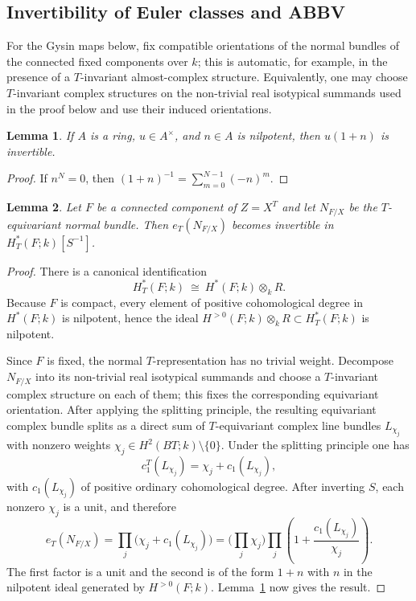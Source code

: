 \documentclass[10pt,a4paper,dvipsnames,x11names]{amsart}
\numberwithin{equation}{section}
\theoremstyle{plain}
\newtheorem{lemma}[lemma]{Lemma}
\theoremstyle{definition}
\theoremstyle{remark}
\begin{document}
\subsection{Invertibility of Euler classes and ABBV}

For the Gysin maps below, fix compatible orientations of the normal bundles of the connected fixed components over $k$; this is automatic, for example, in the presence of a $T$-invariant almost-complex structure.  Equivalently, one may choose $T$-invariant complex structures on the non-trivial real isotypical summands used in the proof below and use their induced orientations.

\begin{lemma}\label{lem:unit-nilp}
If $A$ is a ring, $u\in A^\times$, and $n\in A$ is nilpotent, then $u(1+n)$ is invertible.
\end{lemma}

\begin{proof}
If $n^N=0$, then $(1+n)^{-1}=\sum_{m=0}^{N-1}(-n)^m$.
\end{proof}

\begin{lemma}\label{lem:euler-invert}
Let $F$ be a connected component of $Z=X^T$ and let $N_{F/X}$ be the $T$-equivariant normal bundle.
Then $e_T(N_{F/X})$ becomes invertible in $H_T^*(F;k)[S^{-1}]$.
\end{lemma}

\begin{proof}
There is a canonical identification
$$
H_T^*(F;k)\ \cong\ H^*(F;k)\otimes_k R.
$$
Because $F$ is compact, every element of positive cohomological degree in $H^*(F;k)$ is nilpotent, hence the ideal
$H^{>0}(F;k)\otimes_k R \subset H_T^*(F;k)$ is nilpotent.

Since $F$ is fixed, the normal $T$-representation has no trivial weight.  Decompose $N_{F/X}$ into its non-trivial real isotypical summands and choose a $T$-invariant complex structure on each of them; this fixes the corresponding equivariant orientation.  After applying the splitting principle, the resulting equivariant complex bundle splits as a direct sum of $T$-equivariant complex line bundles $L_{\chi_j}$ with nonzero weights $\chi_j\in H^2(BT;k)\setminus\{0\}$.
Under the splitting principle one has
$$
c_1^T(L_{\chi_j})=\chi_j+c_1(L_{\chi_j}),
$$
with $c_1(L_{\chi_j})$ of positive ordinary cohomological degree.  After inverting $S$, each nonzero $\chi_j$ is a unit, and therefore
$$
e_T(N_{F/X})
=\prod_j\bigl(\chi_j+c_1(L_{\chi_j})\bigr)
=\Big(\prod_j\chi_j\Big)
\prod_j\left(1+\frac{c_1(L_{\chi_j})}{\chi_j}\right).
$$
The first factor is a unit and the second is of the form $1+n$ with $n$ in the nilpotent ideal generated by $H^{>0}(F;k)$.  Lemma~\ref{lem:unit-nilp} now gives the result.
\end{proof}
\end{document}
